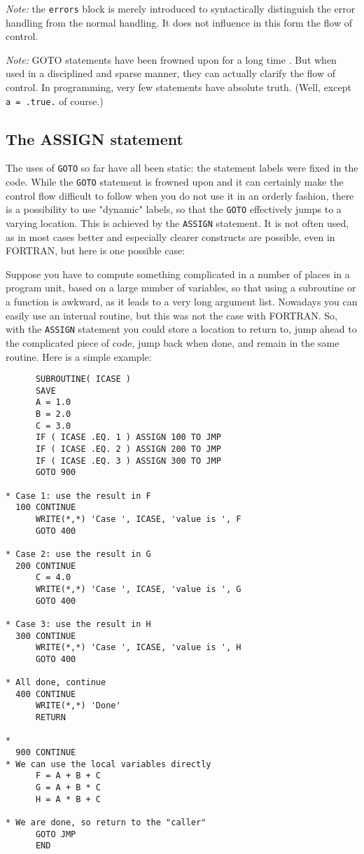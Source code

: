 \emph{Note:} the \verb+errors+ block is merely introduced to syntactically
distinguish the error handling from the normal handling. It does not influence
in this form the flow of control.

\emph{Note:} GOTO statements have been frowned upon for a long time \cite{GOTOHarmful}.
But when used in a disciplined and sparse manner, they can actually clarify the flow of control.
In programming, very few statements have absolute truth. (Well, except \verb+a = .true.+ of course.)


\subsection{The ASSIGN statement}
The uses of \verb+GOTO+ so far have all been static: the statement labels were fixed
in the code. While the \verb+GOTO+ statement is frowned upon and it can certainly make
the control flow difficult to follow when you do not use it in an orderly fashion, there
is a possibility to use "dynamic" labels, so that the \verb+GOTO+ effectively jumps to
a varying location. This is achieved by the \verb+ASSIGN+ statement. It is not often
used, as in most cases better and especially clearer constructs are possible, even
in FORTRAN, but here is one possible case:

\noindent Suppose you have to compute something complicated in a number of places in a
program unit, based on a large number of variables, so that using a subroutine or
a function is awkward, as it leads to a very long argument list. Nowadays you
can easily use an internal routine, but this was not the case with FORTRAN.
So, with the \verb+ASSIGN+ statement you could store a location to return to,
jump ahead to the complicated piece of code, jump back when done, and remain in
the same routine. Here is a simple example:
%
\begin{verbatim}
      SUBROUTINE( ICASE )
      SAVE
      A = 1.0
      B = 2.0
      C = 3.0
      IF ( ICASE .EQ. 1 ) ASSIGN 100 TO JMP
      IF ( ICASE .EQ. 2 ) ASSIGN 200 TO JMP
      IF ( ICASE .EQ. 3 ) ASSIGN 300 TO JMP
      GOTO 900

* Case 1: use the result in F
  100 CONTINUE
      WRITE(*,*) 'Case ', ICASE, 'value is ', F
      GOTO 400

* Case 2: use the result in G
  200 CONTINUE
      C = 4.0
      WRITE(*,*) 'Case ', ICASE, 'value is ', G
      GOTO 400

* Case 3: use the result in H
  300 CONTINUE
      WRITE(*,*) 'Case ', ICASE, 'value is ', H
      GOTO 400

* All done, continue
  400 CONTINUE
      WRITE(*,*) 'Done'
      RETURN

*
  900 CONTINUE
* We can use the local variables directly
      F = A + B + C
      G = A + B * C
      H = A * B + C

* We are done, so return to the "caller"
      GOTO JMP
      END
\end{verbatim}

